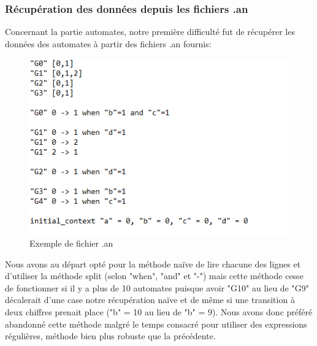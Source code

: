 \subsubsection{Récupération des données depuis les fichiers .an}
Concernant la partie automates, notre première difficulté fut de récupérer les données des automates à partir des fichiers .an fournis:
\newpage
\begin{figure}
\includegraphics[scale=1]{images/fichier_an.PNG} 
\caption{Exemple de fichier .an}
\end{figure}
Nous avons au départ opté pour la méthode naïve de lire chacune des lignes et d'utiliser la méthode split (selon "when", "and" et "-") mais cette méthode cesse de fonctionner si  il y a plus de 10 automates puisque avoir "G10" au lieu de "G9" décalerait d'une case notre récupération naïve et de même si une transition à deux chiffres prenait place ("b" = 10 au lieu de "b" = 9). 
\newline
Nous avons donc préféré abandonné cette méthode malgré le temps consacré pour utiliser des expressions régulières, méthode bien plus robuste que la précédente.


